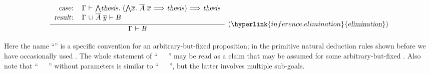 \begin{isabellebody}
\begin{isamarkuptext}
  \[
  \infer[(\hyperlink{inference.elimination}{\mbox{\isa{elimination}}})]{\isa{{\isachardoublequote}{\isasymGamma}\ {\isasymturnstile}\ B{\isachardoublequote}}}{
    \begin{tabular}{rl}
    \isa{{\isachardoublequote}case{\isacharcolon}{\isachardoublequote}} &
    \isa{{\isachardoublequote}{\isasymGamma}\ {\isasymturnstile}\ {\isasymAnd}thesis{\isachardot}\ {\isacharparenleft}{\isasymAnd}\isactrlvec x{\isachardot}\ \isactrlvec A\ \isactrlvec x\ {\isasymLongrightarrow}\ thesis{\isacharparenright}\ {\isasymLongrightarrow}\ thesis{\isachardoublequote}} \\[0.2ex]
    \isa{{\isachardoublequote}result{\isacharcolon}{\isachardoublequote}} &
    \isa{{\isachardoublequote}{\isasymGamma}\ {\isasymunion}\ \isactrlvec A\ \isactrlvec y\ {\isasymturnstile}\ B{\isachardoublequote}} \\[0.2ex]
    \end{tabular}}
  \]

  \noindent Here the name ``'' is a specific convention
  for an arbitrary-but-fixed proposition; in the primitive natural
  deduction rules shown before we have occasionally used .
  The whole statement of ``\hyperlink{command.obtain}{\mbox{}}~~\hyperlink{keyword.where}{\mbox{}}~'' may be read as a claim that 
  may be assumed for some arbitrary-but-fixed .  Also note
  that ``\hyperlink{command.obtain}{\mbox{}}~~\hyperlink{keyword.and}{\mbox{}}~''
  without parameters is similar to ``\hyperlink{command.have}{\mbox{}}~~\hyperlink{keyword.and}{\mbox{}}~'', but the latter involves multiple
  sub-goals.


\end{isamarkuptext}
\end{isabellebody}
